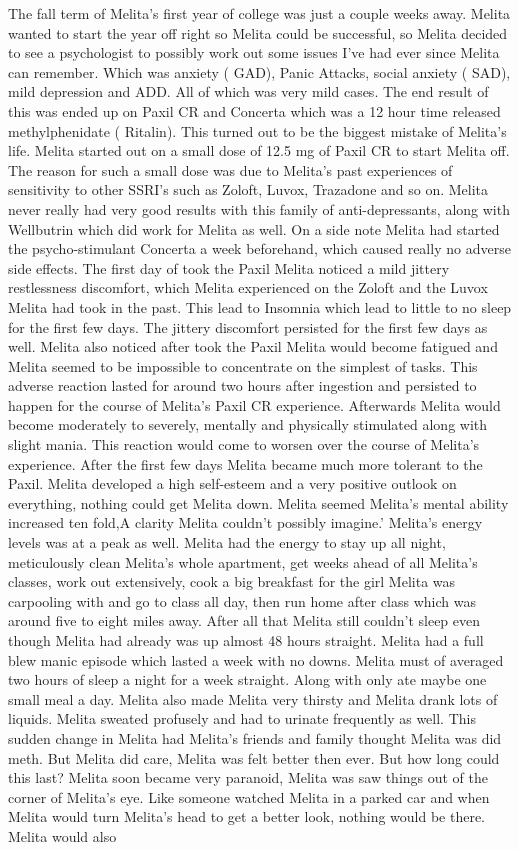 \documentclass[12pt]{book}
\begin{document}
The fall term of Melita's first year of college was just a couple weeks away. Melita wanted to start the year off right so Melita could be successful, so Melita decided to see a psychologist to possibly work out some issues I've had ever since Melita can remember. Which was anxiety ( GAD), Panic Attacks, social anxiety ( SAD), mild depression and ADD. All of which was very mild cases. The end result of this was ended up on Paxil CR and Concerta which was a 12 hour time released methylphenidate ( Ritalin). This turned out to be the biggest mistake of Melita's life. Melita started out on a small dose of 12.5 mg of Paxil CR to start Melita off. The reason for such a small dose was due to Melita's past experiences of sensitivity to other SSRI's such as Zoloft, Luvox, Trazadone and so on. Melita never really had very good results with this family of anti-depressants, along with Wellbutrin which did work for Melita as well. On a side note Melita had started the psycho-stimulant Concerta a week beforehand, which caused really no adverse side effects. The first day of took the Paxil Melita noticed a mild jittery restlessness discomfort, which Melita experienced on the Zoloft and the Luvox Melita had took in the past. This lead to Insomnia which lead to little to no sleep for the first few days. The jittery discomfort persisted for the first few days as well. Melita also noticed after took the Paxil Melita would become fatigued and Melita seemed to be impossible to concentrate on the simplest of tasks. This adverse reaction lasted for around two hours after ingestion and persisted to happen for the course of Melita's Paxil CR experience. Afterwards Melita would become moderately to severely, mentally and physically stimulated along with slight mania. This reaction would come to worsen over the course of Melita's experience. After the first few days Melita became much more tolerant to the Paxil. Melita developed a high self-esteem and a very positive outlook on everything, nothing could get Melita down. Melita seemed Melita's mental ability increased ten fold,A clarity Melita couldn't possibly imagine.' Melita's energy levels was at a peak as well. Melita had the energy to stay up all night, meticulously clean Melita's whole apartment, get weeks ahead of all Melita's classes, work out extensively, cook a big breakfast for the girl Melita was carpooling with and go to class all day, then run home after class which was around five to eight miles away. After all that Melita still couldn't sleep even though Melita had already was up almost 48 hours straight. Melita had a full blew manic episode which lasted a week with no downs. Melita must of averaged two hours of sleep a night for a week straight. Along with only ate maybe one small meal a day. Melita also made Melita very thirsty and Melita drank lots of liquids. Melita sweated profusely and had to urinate frequently as well. This sudden change in Melita had Melita's friends and family thought Melita was did meth. But Melita did care, Melita was felt better then ever. But how long could this last? Melita soon became very paranoid, Melita was saw things out of the corner of Melita's eye. Like someone watched Melita in a parked car and when Melita would turn Melita's head to get a better look, nothing would be there. Melita would also 
\end{document}
